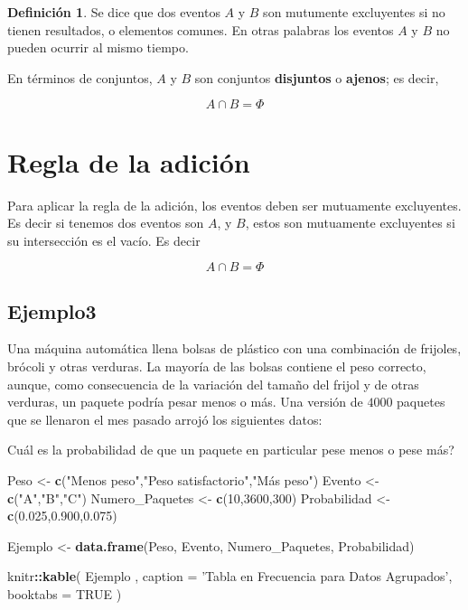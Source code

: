\documentclass[
]{book}
\newenvironment{Shaded}{\begin{snugshade}}{\end{snugshade}}
\newcommand{\DataTypeTok}[1]{\textcolor[rgb]{0.13,0.29,0.53}{#1}}
\newcommand{\DecValTok}[1]{\textcolor[rgb]{0.00,0.00,0.81}{#1}}
\newcommand{\FloatTok}[1]{\textcolor[rgb]{0.00,0.00,0.81}{#1}}
\newcommand{\KeywordTok}[1]{\textcolor[rgb]{0.13,0.29,0.53}{\textbf{#1}}}
\newcommand{\NormalTok}[1]{#1}
\newcommand{\OperatorTok}[1]{\textcolor[rgb]{0.81,0.36,0.00}{\textbf{#1}}}
\newcommand{\OtherTok}[1]{\textcolor[rgb]{0.56,0.35,0.01}{#1}}
\newcommand{\StringTok}[1]{\textcolor[rgb]{0.31,0.60,0.02}{#1}}
\theoremstyle{definition}
\newtheorem{definition}{Definición}[chapter]
\theoremstyle{definition}
\theoremstyle{definition}
\theoremstyle{definition}
\theoremstyle{remark}
\begin{document}
\begin{definition}
\protect\hypertarget{def:unnamed-chunk-45}{}{\label{def:unnamed-chunk-45} }Se dice que dos eventos \(A\) y \(B\) son mutumente excluyentes si no tienen resultados, o elementos comunes. En otras palabras los eventos \(A\) y \(B\) no pueden ocurrir al mismo tiempo.
\end{definition}

En términos de conjuntos, \(A\) y \(B\) son conjuntos \textbf{disjuntos} o \textbf{ajenos}; es decir,

\[
A \cap B=\Phi
\]

\hypertarget{regla-de-la-adiciuxf3n}{%
\section{Regla de la adición}\label{regla-de-la-adiciuxf3n}}

Para aplicar la regla de la adición, los eventos deben ser mutuamente excluyentes. Es decir si tenemos dos eventos son \(A\), y \(B\), estos son mutuamente excluyentes si su intersección es el vacío. Es decir

\[
A\cap B =\Phi
\]

\hypertarget{ejemplo3-1}{%
\subsection{Ejemplo3}\label{ejemplo3-1}}

Una máquina automática llena bolsas de plástico con una combinación de frijoles, brócoli y otras verduras. La mayoría de las bolsas contiene el peso correcto, aunque, como consecuencia de la variación del tamaño del frijol y de otras verduras, un paquete podría pesar menos o más. Una versión de \(4000\) paquetes que se llenaron el mes pasado arrojó los siguientes datos:

Cuál es la probabilidad de que un paquete en particular pese menos o pese más?

\begin{Shaded}
\begin{Highlighting}[]
\NormalTok{Peso <-}\StringTok{ }\KeywordTok{c}\NormalTok{(}\StringTok{"Menos peso"}\NormalTok{,}\StringTok{"Peso satisfactorio"}\NormalTok{,}\StringTok{"Más peso"}\NormalTok{)}
\NormalTok{Evento <-}\StringTok{ }\KeywordTok{c}\NormalTok{(}\StringTok{"A"}\NormalTok{,}\StringTok{"B"}\NormalTok{,}\StringTok{"C"}\NormalTok{)}
\NormalTok{Numero_Paquetes <-}\StringTok{ }\KeywordTok{c}\NormalTok{(}\DecValTok{10}\NormalTok{,}\DecValTok{3600}\NormalTok{,}\DecValTok{300}\NormalTok{)}
\NormalTok{Probabilidad <-}\StringTok{ }\KeywordTok{c}\NormalTok{(}\FloatTok{0.025}\NormalTok{,}\FloatTok{0.900}\NormalTok{,}\FloatTok{0.075}\NormalTok{)}

\NormalTok{Ejemplo <-}\StringTok{ }\KeywordTok{data.frame}\NormalTok{(Peso, Evento, Numero_Paquetes, Probabilidad)}

\NormalTok{knitr}\OperatorTok{::}\KeywordTok{kable}\NormalTok{(}
\NormalTok{Ejemplo , }\DataTypeTok{caption =} \StringTok{'Tabla en Frecuencia para Datos Agrupados'}\NormalTok{,}
  \DataTypeTok{booktabs =} \OtherTok{TRUE}
\NormalTok{)}
\end{Highlighting}
\end{Shaded}
\end{document}
